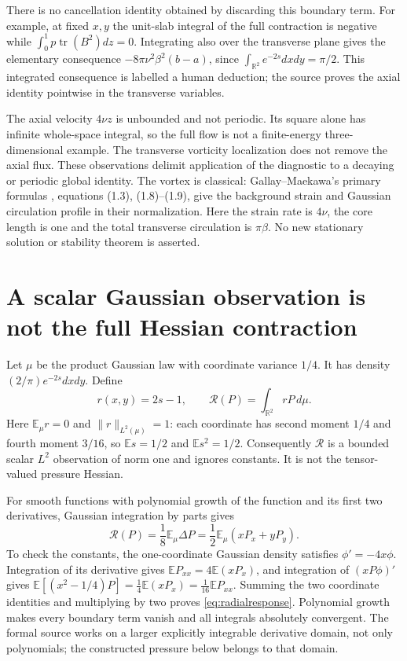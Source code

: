 \documentclass[11pt]{article}
\newcommand{\E}{\mathbb E}
\begin{document}
There is no cancellation identity obtained by discarding this boundary
term. For example, at fixed $x,y$ the unit-slab integral of the full
contraction is negative while
$\int_0^1p\operatorname{tr}(B^2)dz=0$.
Integrating also over the transverse plane gives the elementary
consequence $-8\pi\nu^2\beta^2(b-a)$, since
$\int_{\mathbb R^2}e^{-2s}dxdy=\pi/2$. This integrated consequence is
labelled a human deduction; the source proves the axial identity
pointwise in the transverse variables.

The axial velocity $4\nu z$ is unbounded and not periodic. Its square
alone has infinite whole-space integral, so the full flow is not a
finite-energy three-dimensional example. The transverse vorticity
localization does not remove the axial flux. These observations delimit
application of the diagnostic to a decaying or periodic global identity.
The vortex is classical: Gallay--Maekawa's primary formulas
\cite{GM}, equations (1.3), (1.8)--(1.9), give the background strain
and Gaussian circulation profile in their normalization. Here the
strain rate is $4\nu$, the core length is one and the total
transverse circulation is $\pi\beta$. No new stationary solution or
stability theorem is asserted.

\section{A scalar Gaussian observation is not the full Hessian contraction}\label{sec:scalargaussian}
Let $\mu$ be the product Gaussian law with coordinate variance $1/4$.
It has density $(2/\pi)e^{-2s}dxdy$. Define
\[
 r(x,y)=2s-1,\qquad
 \mathcal R(P)=\int_{\mathbb R^2}rP\,d\mu.
\]
Here $\E_\mu r=0$ and $\|r\|_{L^2(\mu)}=1$: each coordinate has
second moment $1/4$ and fourth moment $3/16$, so
$\E s=1/2$ and $\E s^2=1/2$. Consequently $\mathcal R$ is a
bounded scalar $L^2$ observation of norm one and ignores constants.
It is not the tensor-valued pressure Hessian.

For smooth functions with polynomial growth of the function and its
first two derivatives, Gaussian integration by parts gives
\begin{equation}\label{eq:radialresponse}
 \mathcal R(P)=\frac18\E_\mu\Delta P
             =\frac12\E_\mu(xP_x+yP_y).
\end{equation}
To check the constants, the one-coordinate Gaussian density satisfies
$\phi'=-4x\phi$. Integration of its derivative gives
$\E P_{xx}=4\E(xP_x)$, and integration of $(xP\phi)'$ gives
$\E[(x^2-1/4)P]=\frac14\E(xP_x)=\frac1{16}\E P_{xx}$.
Summing the two coordinate identities and multiplying by two proves
\eqref{eq:radialresponse}. Polynomial growth makes every boundary term
vanish and all integrals absolutely convergent. The formal source
works on a larger explicitly integrable derivative domain, not only
polynomials; the constructed pressure below belongs to that domain.
\end{document}
